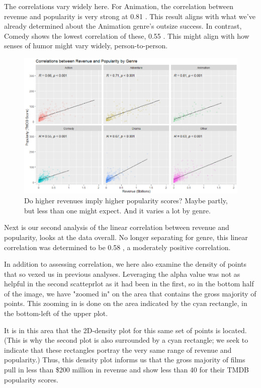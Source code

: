 \documentclass[12pt]{article}
\begin{document}
The correlations vary widely here. For Animation, the correlation between revenue and popularity is very strong at 0.81 . This result aligns with what we've already determined about the Animation genre's outsize success. In contrast, Comedy shows the lowest correlation of these, 0.55 . This might align with how senses of humor might vary widely, person-to-person.

\begin{figure}[H]
    \centering
    \includegraphics[width=1\textwidth]{images/OLD_Linear corrs betw rev and pop by genre.png}
    \caption{Do higher revenues imply higher popularity scores? Maybe partly, but less than one might expect. And it varies a lot by genre.}
    \label{fig:figure_6}
\end{figure}

Next is our second analysis of the linear correlation between revenue and popularity, looks at the data overall. No longer separating for genre, this linear correlation was determined to be 0.58 , a moderately positive correlation.

In addition to assessing correlation, we here also examine the density of points that so vexed us in previous analyses. Leveraging the alpha value was not as helpful in the second scatteprlot as it had been in the first, so in the bottom half of the image, we have "zoomed in" on the area that contains the gross majority of points. This zooming in is done on the area indicated by the cyan rectangle, in the bottom-left of the upper plot. 

It is in this area that the 2D-density plot for this same set of points is located. (This is why the second plot is also surrounded by a cyan rectangle; we seek to indicate that these rectangles portray the very same range of revenue and popularity.) Thus, this density plot informs us that the gross majority of films pull in less than \$200 million in revenue and show less than 40 for their TMDB popularity scores.
\end{document}
